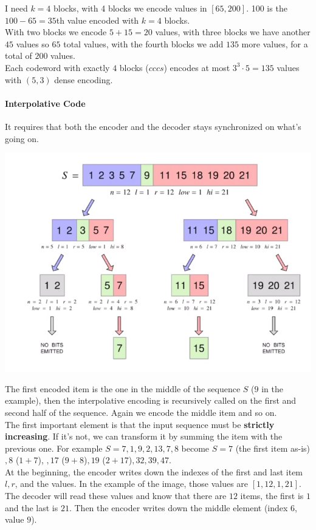 \documentclass[10pt]{report}
\begin{document}
I need $k=4$ blocks, with 4 blocks we encode values in $[65, 200]$. 100 is the $100-65 = 35$th value encoded with $k=4$ blocks.\\
With two blocks we encode $5+15 = 20$ values, with three blocks we have another $45$ values so $65$ total values, with the fourth blocks we add $135$ more values, for a total of $200$ values.\\
Each codeword with exactly $4$ blocks ($cccs$) encodes at most $3^3\cdot 5 = 135$ values with $(5,3)$ dense encoding.
\paragraph{Interpolative Code} It requires that both the encoder and the decoder stays synchronized on what's going on.
\begin{center}
	\includegraphics[scale=0.8]{11.png}
\end{center}
The first encoded item is the one in the middle of the sequence $S$ ($9$ in the example), then the interpolative encoding is recursively called on the first and second half of the sequence. Again we encode the middle item and so on.\\
The first important element is that the input sequence must be \textbf{strictly increasing}. If it's not, we can transform it by summing the item with the previous one. For example $S = 7,1,9,2,13,7,8$ become $S = 7$ (the first item as-is)$, 8$ ($1+7$), $, 17$ ($9+8$)$, 19$ ($2+17$)$, 32, 39, 47$.\\
At the beginning, the encoder writes down the indexes of the first and last item $l, r$, and the values. In the example of the image, those values are $[1,12,1,21]$. The decoder will read these values and know that there are $12$ items, the first is $1$ and the last is $21$. Then the encoder writes down the middle element (index $6$, value $9$).\\
\end{document}
